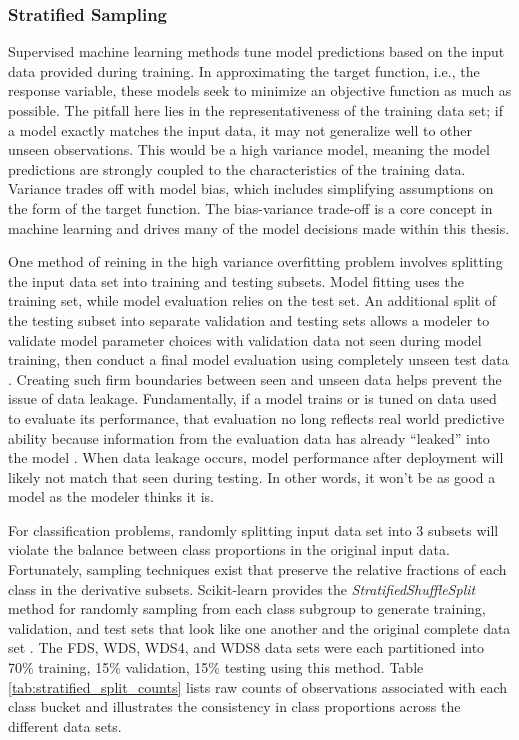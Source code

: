 \subsubsection{Stratified Sampling}\label{ch3:strat_sample}
Supervised machine learning methods tune model predictions based on the input data provided during training. In approximating the target function, i.e., the response variable, these models seek to minimize an objective function as much as possible. The pitfall here lies in the representativeness of the training data set; if a model exactly matches the input data, it may not generalize well to other unseen observations. This would be a high variance model, meaning the model predictions are strongly coupled to the characteristics of the training data. Variance trades off with model bias, which includes simplifying assumptions on the form of the target function. The bias-variance trade-off is a core concept in machine learning \citep[p.\ 33-36]{james_introduction_2013} and drives many of the model decisions made within this thesis.

One method of reining in the high variance overfitting problem involves splitting the input data set into training and testing subsets. Model fitting uses the training set, while model evaluation relies on the test set. An additional split of the testing subset into separate validation and testing sets allows a modeler to validate model parameter choices with validation data not seen during model training, then conduct a final model evaluation using completely unseen test data \citep[p.\ 222]{hastie_elements_2009}. Creating such firm boundaries between seen and unseen data helps prevent the issue of data leakage. Fundamentally, if a model trains or is tuned on data used to evaluate its performance, that evaluation no long reflects real world predictive ability because information from the evaluation data has already ``leaked'' into the model \citep{kaufman_leakage_2012}. When data leakage occurs, model performance after deployment will likely not match that seen during testing. In other words, it won’t be as good a model as the modeler thinks it is.

For classification problems, randomly splitting input data set into 3 subsets will violate the balance between class proportions in the original input data. Fortunately, sampling techniques exist that preserve the relative fractions of each class in the derivative subsets. Scikit-learn provides the \textit{StratifiedShuffleSplit} method for randomly sampling from each class subgroup to generate training, validation, and test sets that look like one another and the original complete data set \citep{scikit-learn_sklearnmodel_selectionstratifiedshufflesplit_2021}. The FDS, WDS, WDS4, and WDS8 data sets were each partitioned into 70\% training, 15\% validation, 15\% testing using this method. Table \ref{tab:stratified_split_counts} lists raw counts of observations associated with each class bucket and illustrates the consistency in class proportions across the different data sets.

